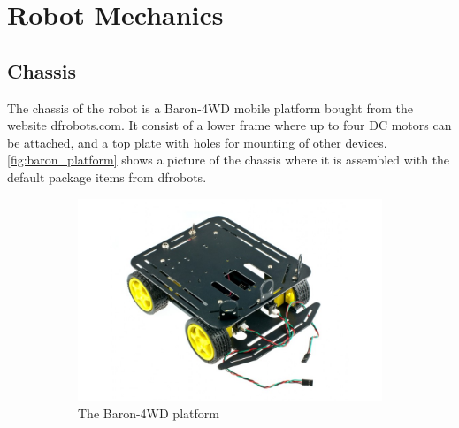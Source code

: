 \documentclass[Main]{subfiles}
\begin{document}
\section{Robot Mechanics} %
	\label{sec:robot_mechanics}

	\subsection{Chassis} %
	\label{sub:chassis}
		The chassis of the robot is a Baron-4WD mobile platform bought from the website dfrobots.com. 
		It consist of a lower frame where up to four DC motors can be attached, and a top plate with holes for mounting of other devices. 
		\autoref{fig:baron_platform} shows a picture of the chassis where it is assembled with the default package items from dfrobots.
		\begin{figure}[H]
			\centering
			\begin{subfigure}[b]{0.55\linewidth}
				\includegraphics[width=1\linewidth]{./Figures/baron_platform.jpg}
				\caption{The Baron-4WD platform}
				\label{fig:baron_platform}
			\end{subfigure}	
			\begin{subfigure}[b]{0.4\linewidth}

\end{subfigure}
\end{figure}
\end{document}
